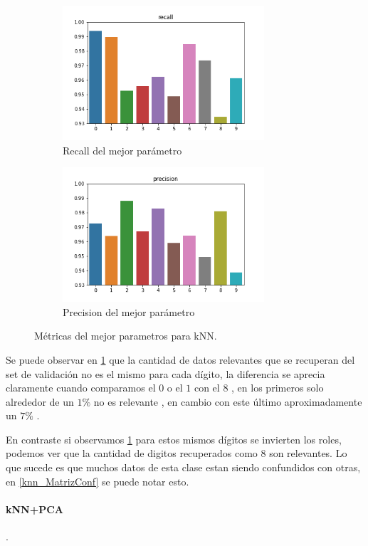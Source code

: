 \begin{figure}[H]
\begin{subfigure}{0.5\textwidth}
\includegraphics[width=0.9\linewidth, height=5cm]{images/recall_knn.png} 
\caption{Recall del mejor parámetro}
\label{knn_métricas1}%
\end{subfigure}
\begin{subfigure}{0.5\textwidth}
\includegraphics[width=0.9\linewidth, height=5cm]{images/precision_knn.png} 
\caption{Precision del mejor parámetro}
\label{knn_métricas2}%
\end{subfigure}
\caption{Métricas del mejor parametros para kNN.}
\label{knn_métricas}%
\end{figure}


Se puede observar en \ref{knn_métricas1} que la cantidad de datos relevantes que se recuperan del set de validación no es el mismo para cada dígito, la diferencia se aprecia claramente cuando comparamos el $0$ o el $1$ con el $8$ , en los primeros solo alrededor de un $1\%$ no es relevante , en cambio con este último aproximadamente un  $7\%$ .

En contraste si observamos \ref{knn_métricas1} para estos mismos dígitos se invierten los roles, podemos ver que la cantidad de digitos recuperados como $8$ son relevantes.
Lo que sucede es que muchos datos de esta clase estan siendo confundidos con otras, en \ref{knn_MatrizConf} se puede notar esto.
\paragraph{kNN+PCA}.


